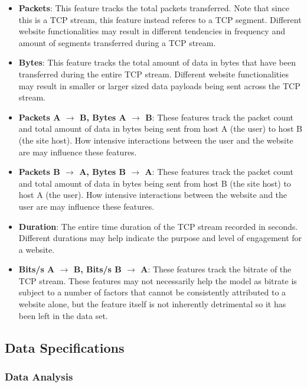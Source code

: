 \documentclass[10pt,sigconf,letterpaper,nonacm]{acmart}
\begin{document}
\begin{itemize}
  \item \textbf{Packets}: This feature tracks the total packets transferred. Note that since this is a TCP stream, this feature instead referes to a TCP segment. Different website functionalities may result in different tendencies in frequency and amount of segments transferred during a TCP stream.
  
  \item \textbf{Bytes}: This feature tracks the total amount of data in bytes that have been transferred during the entire TCP stream. Different website functionalities may result in smaller or larger sized data payloads being sent across the TCP stream.
  
  \item \textbf{Packets A $\rightarrow$ B, Bytes A $\rightarrow$ B}: These features track the packet count and total amount of data in bytes being sent from host A (the user) to host B (the site host). How intensive interactions between the user and the website are may influence these features.
  
  \item \textbf{Packets B $\rightarrow$ A, Bytes B $\rightarrow$ A}: These features track the packet count and total amount of data in bytes being sent from host B (the site host) to host A (the user). How intensive interactions between the website and the user are may influence these features.
  
  \item \textbf{Duration}: The entire time duration of the TCP stream recorded in seconds. Different durations may help indicate the purpose and level of engagement for a website.
  
  \item \textbf{Bits/s A $\rightarrow$ B, Bits/s B $\rightarrow$ A}: These features track the bitrate of the TCP stream. These features may not necessarily help the model as bitrate is subject to a number of factors that cannot be consistently attributed to a website alone, but the feature itself is not inherently detrimental so it has been left in the data set.
\end{itemize}

\subsection{Data Specifications}

\subsubsection{Data Analysis}
\end{document}
